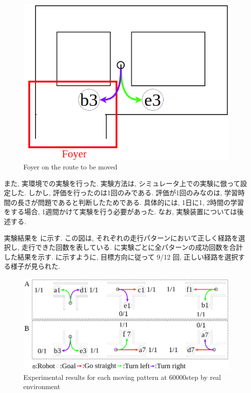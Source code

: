 \begin{figure}[hbtp]
  \centering
 \includegraphics[keepaspectratio, scale=0.4]
      {images/howaie2.png}
 \caption{Foyer on the route to be moved}
 \label{Fig:howaie}
\end{figure}

また, 実環境での実験を行った. 実験方法は, シミュレータ上での実験に倣って設定した. しかし, 評価を行ったのは1回のみである. 評価が1回のみなのは, 学習時間の長さが問題であると判断したためである. 具体的には, 1日に1, 2時間の学習をする場合, 1週間かけて実験を行う必要があった. なお, 実験装置については後述する.

実験結果を  に示す. この図は, それぞれの走行パターンにおいて正しく経路を選択し, 走行できた回数を表している.  に実験ごとに全パターンの成功回数を合計した結果を示す.  に示すように, 目標方向に従って 9/12 回, 正しい経路を選択する様子が見られた.

\begin{figure}[hbtp]
  \centering
 \includegraphics[keepaspectratio, scale=0.4]
      {images/60000step_real2.png}
 \caption{Experimental results for each moving pattern at 60000step by real environment}
 \label{Fig:60000step_real}
\end{figure}

